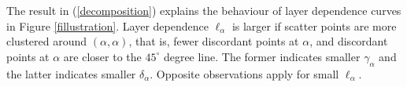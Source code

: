 \documentclass[authoryear]{elsarticle}
\newcommand{\E}{{\mathrm E}}
\newcommand{\eref}[1]{(\ref{#1})}
\newcommand{\fref}[1]{Figure \ref{#1}}
\newcommand{\sref}[1]{\S\ref{#1}}
\begin{document}
The result in \eref{decomposition} explains the behaviour of layer dependence curves in \fref{fillustration}. Layer dependence $\ell_\alpha$ is larger if scatter points are more clustered around $(\alpha,\alpha)$, that is, fewer discordant points at $\alpha$, and discordant points at $\alpha$ are closer to the $45^\circ$ degree line. The former indicates smaller $\gamma_\alpha$ and the latter indicates smaller $\delta_\alpha$. Opposite observations apply for small $\ell_\alpha$.

\end{document}
